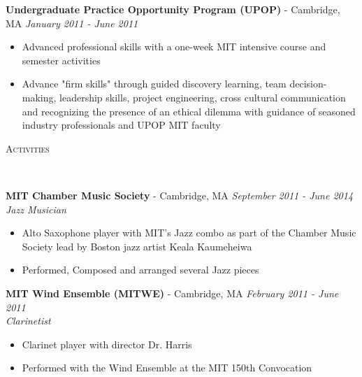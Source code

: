\documentclass{article}
\newenvironment{changemargin}[2]{%
  \begin{list}{}{%
    \setlength{\topsep}{0pt}%
    \setlength{\leftmargin}{#1}%
    \setlength{\rightmargin}{#2}%
    \setlength{\listparindent}{\parindent}%
    \setlength{\itemindent}{\parindent}%
    \setlength{\parsep}{\parskip}%
  }%
  \item[]}{\end{list}
}
\newcommand{\lineover}{
	\begin{changemargin}{-0.05in}{-0.05in}
		\vspace*{-8pt}
		\hrulefill \\
		\vspace*{-2pt}
	\end{changemargin}
}
\newcommand{\header}[1]{
	\begin{changemargin}{-0.5in}{-0.5in}
		\scshape{#1}\\
  	\lineover
	\end{changemargin}
}
\newenvironment{body} {
	\vspace*{-16pt}
	\begin{changemargin}{-0.25in}{-0.5in}
  }	
	{\end{changemargin}
}
\begin{document}
\begin{body}
	\textbf{Undergraduate Practice Opportunity Program (UPOP)} - Cambridge, MA \hfill \emph{January 2011 - June 2011}\\
	\vspace*{-3pt}
	\begin{itemize} \itemsep -2pt
		\item Advanced professional skills with a one-week MIT intensive course and semester activities
        \item Advance "firm skills" through guided discovery learning, team decision-making, leadership skills, project engineering, cross cultural communication and recognizing the presence of an ethical dilemma with guidance of seasoned industry professionals and UPOP MIT faculty
	\end{itemize}
	\vspace{5 pt}

	\vspace{5pt}

\end{body}

\newpage

\header{Activities}

\begin{body}
	\vspace{16pt}
    \textbf{MIT Chamber Music Society} - Cambridge, MA \hfill \emph{September 2011 - June 2014}\\
	\emph{Jazz Musician}\\
	\vspace*{-3pt}
	\begin{itemize} \itemsep -2pt  %
    	\item Alto Saxophone player with MIT's Jazz combo as part of the Chamber Music Society lead by Boston jazz artist 
		Keala Kaumeheiwa
        \item Performed, Composed and arranged several Jazz pieces
	\end{itemize}
	\vspace{5 pt}
    
    \textbf{MIT Wind Ensemble (MITWE)} - Cambridge, MA \hfill \emph{February 2011 - June 2011}\\
	\emph{Clarinetist}\\
	\vspace*{-3pt}
	\begin{itemize} \itemsep -2pt  %
    	\item Clarinet player with director Dr. Harris
        \item Performed with the Wind Ensemble at the MIT 150th Convocation 
	\end{itemize}
	\vspace{5 pt}
    
\end{body}
\end{document}
